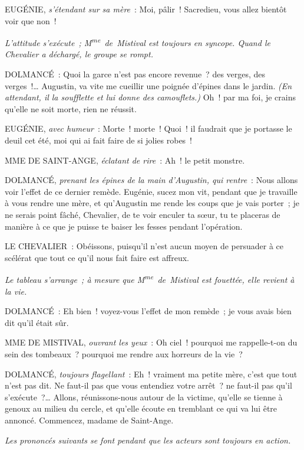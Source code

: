 \documentclass[french,twoside]{book} %
\begin{document}
EUGÉNIE, {\itshape s’étendant sur sa mère} : Moi, pâlir ! Sacredieu, vous allez bientôt voir que non !\par
{\itshape L’attitude s’exécute ; M\textsuperscript{me} de Mistival est toujours en syncope. Quand le Chevalier a déchargé, le groupe se rompt. }\par
DOLMANCÉ : Quoi la garce n’est pas encore revenue ? des verges, des verges !… Augustin, va vite me cueillir une poignée d’épines dans le jardin. {\itshape (En attendant, il la soufflette et lui donne des camouflets.)} Oh ! par ma foi, je crains qu’elle ne soit morte, rien ne réussit.\par
EUGÉNIE, {\itshape avec humeur} : Morte ! morte ! Quoi ! il faudrait que je portasse le deuil cet été, moi qui ai fait faire de si jolies robes !\par
MME DE SAINT-ANGE, {\itshape éclatant de rire} : Ah ! le petit monstre.\par
DOLMANCÉ, {\itshape prenant les épines de la main d’Augustin, qui rentre} : Nous allons voir l’effet de ce dernier remède. Eugénie, sucez mon vit, pendant que je travaille à vous rendre une mère, et qu’Augustin me rende les coups que je vais porter ; je ne serais point fâché, Chevalier, de te voir enculer ta sœur, tu te placeras de manière à ce que je puisse te baiser les fesses pendant l’opération.\par
LE CHEVALIER : Obéissons, puisqu’il n’est aucun moyen de persuader à ce scélérat que tout ce qu’il nous fait faire est affreux.\par
{\itshape Le tableau s’arrange ; à mesure que M\textsuperscript{me} de Mistival est fouettée, elle revient à la vie. }\par
DOLMANCÉ : Eh bien ! voyez-vous l’effet de mon remède ; je vous avais bien dit qu’il était sûr.\par
MME DE MISTIVAL, {\itshape ouvrant les yeux} : Oh ciel ! pourquoi me rappelle-t-on du sein des tombeaux ? pourquoi me rendre aux horreurs de la vie ?\par
DOLMANCÉ, {\itshape toujours flagellant} : Eh ! vraiment ma petite mère, c’est que tout n’est pas dit. Ne faut-il pas que vous entendiez votre arrêt ? ne faut-il pas qu’il s’exécute ?… Allons, réunissons-nous autour de la victime, qu’elle se tienne à genoux au milieu du cercle, et qu’elle écoute en tremblant ce qui va lui être annoncé. Commencez, madame de Saint-Ange.\par
{\itshape Les prononcés suivants se font pendant que les acteurs sont toujours en action.}\par
\end{document}
